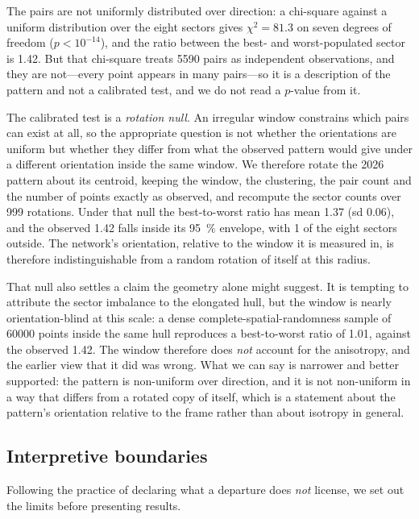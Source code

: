 \documentclass{article}
\newcommand{\isoRatio}{1.42}
\newcommand{\isoChi}{81.3}
\newcommand{\isoRotMean}{1.37}
\newcommand{\isoRotSd}{0.06}
\newcommand{\isoRotOutside}{1}
\begin{document}
The pairs are not uniformly distributed over direction: a chi-square against a uniform
distribution over the eight sectors gives $\chi^2 = \isoChi$ on seven degrees of freedom
($p < 10^{-14}$), and the ratio between the best- and worst-populated sector is
\isoRatio{}. But that chi-square treats \num{5590} pairs as independent observations, and
they are not---every point appears in many pairs---so it is a description of the pattern and
not a calibrated test, and we do not read a $p$-value from it.

The calibrated test is a \emph{rotation null}. An irregular window constrains which pairs can
exist at all, so the appropriate question is not whether the orientations are uniform but
whether they differ from what the observed pattern would give under a different orientation
inside the same window. We therefore rotate the 2026 pattern about its centroid, keeping the
window, the clustering, the pair count and the number of points exactly as observed, and
recompute the sector counts over \num{999} rotations. Under that null the best-to-worst ratio
has mean \isoRotMean{} (sd \isoRotSd), and the observed \isoRatio{} falls inside its
\SI{95}{\percent} envelope, with \isoRotOutside{} of the eight sectors outside. The network's
orientation, relative to the window it is measured in, is therefore indistinguishable from a
random rotation of itself at this radius.

That null also settles a claim the geometry alone might suggest. It is tempting to attribute the
sector imbalance to the elongated hull, but the window is nearly orientation-blind at this
scale: a dense complete-spatial-randomness sample of \num{60000} points inside the same hull
reproduces a best-to-worst ratio of \num{1.01}, against the observed \isoRatio{}. The window
therefore does \emph{not} account for the anisotropy, and the earlier view that it did was
wrong. What we can say is narrower and better supported: the pattern is non-uniform over
direction, and it is not non-uniform in a way that differs from a rotated copy of itself, which
is a statement about the pattern's orientation relative to the frame rather than about isotropy
in general.

\subsection{Interpretive boundaries}
\label{sec:boundaries}

Following the practice of declaring what a departure does \emph{not} license, we set out
the limits before presenting results.
\end{document}
